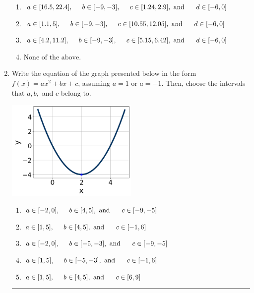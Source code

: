 \documentclass[14pt]{extbook}
\newcommand{\litem}[1]{\item#1\hspace*{-1cm}\rule{\textwidth}{0.4pt}}
\begin{document}
\begin{enumerate}
{\begin{enumerate}[label=\Alph*.]
\item \( a \in [16.5, 22.4], \hspace*{5mm} b \in [-9, -3], \hspace*{5mm} c \in [1.24, 2.9], \text{ and } \hspace*{5mm} d \in [-6, 0] \)
\item \( a \in [1.1, 5], \hspace*{5mm} b \in [-9, -3], \hspace*{5mm} c \in [10.55, 12.05], \text{ and } \hspace*{5mm} d \in [-6, 0] \)
\item \( a \in [4.2, 11.2], \hspace*{5mm} b \in [-9, -3], \hspace*{5mm} c \in [5.15, 6.42], \text{ and } \hspace*{5mm} d \in [-6, 0] \)
\item \( \text{None of the above.} \)

\end{enumerate} }
\litem{
Write the equation of the graph presented below in the form $f(x)=ax^2+bx+c$, assuming  $a=1$ or $a=-1$. Then, choose the intervals that $a, b,$ and $c$ belong to.
\begin{center}
    \includegraphics[width=0.5\textwidth]{../Figures/quadraticGraphToEquationB.png}
\end{center}
\begin{enumerate}[label=\Alph*.]
\item \( a \in [-2, 0], \hspace*{5mm} b \in [4, 5], \text{ and } \hspace*{5mm} c \in [-9, -5] \)
\item \( a \in [1, 5], \hspace*{5mm} b \in [4, 5], \text{ and } \hspace*{5mm} c \in [-1, 6] \)
\item \( a \in [-2, 0], \hspace*{5mm} b \in [-5, -3], \text{ and } \hspace*{5mm} c \in [-9, -5] \)
\item \( a \in [1, 5], \hspace*{5mm} b \in [-5, -3], \text{ and } \hspace*{5mm} c \in [-1, 6] \)
\item \( a \in [1, 5], \hspace*{5mm} b \in [4, 5], \text{ and } \hspace*{5mm} c \in [6, 9] \)


\end{enumerate}}
\end{enumerate}
\end{document}
